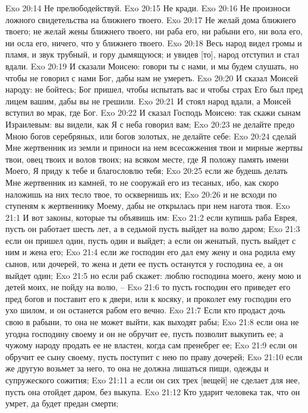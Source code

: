 Exo 20:14  Не прелюбодействуй.
Exo 20:15  Не кради.
Exo 20:16  Не произноси ложного свидетельства на ближнего твоего.
Exo 20:17  Не желай дома ближнего твоего; не желай жены ближнего твоего, ни раба его, ни рабыни его, ни вола его, ни осла его, ничего, что у ближнего твоего.
Exo 20:18  Весь народ видел громы и пламя, и звук трубный, и гору дымящуюся; и увидев [то], народ отступил и стал вдали.
Exo 20:19  И сказали Моисею: говори ты с нами, и мы будем слушать, но чтобы не говорил с нами Бог, дабы нам не умереть.
Exo 20:20  И сказал Моисей народу: не бойтесь; Бог пришел, чтобы испытать вас и чтобы страх Его был пред лицем вашим, дабы вы не грешили.
Exo 20:21  И стоял народ вдали, а Моисей вступил во мрак, где Бог.
Exo 20:22  И сказал Господь Моисею: так скажи сынам Израилевым: вы видели, как Я с неба говорил вам;
Exo 20:23  не делайте предо Мною богов серебряных, или богов золотых, не делайте себе:
Exo 20:24  сделай Мне жертвенник из земли и приноси на нем всесожжения твои и мирные жертвы твои, овец твоих и волов твоих; на всяком месте, где Я положу память имени Моего, Я приду к тебе и благословлю тебя;
Exo 20:25  если же будешь делать Мне жертвенник из камней, то не сооружай его из тесаных, ибо, как скоро наложишь на них тесло твое, то осквернишь их;
Exo 20:26  и не всходи по ступеням к жертвеннику Моему, дабы не открылась при нем нагота твоя.
Exo 21:1  И вот законы, которые ты объявишь им:
Exo 21:2  если купишь раба Еврея, пусть он работает шесть лет, а в седьмой пусть выйдет на волю даром;
Exo 21:3  если он пришел один, пусть один и выйдет; а если он женатый, пусть выйдет с ним и жена его;
Exo 21:4  если же господин его дал ему жену и она родила ему сынов, или дочерей, то жена и дети ее пусть останутся у господина ее, а он выйдет один;
Exo 21:5  но если раб скажет: люблю господина моего, жену мою и детей моих, не пойду на волю, --
Exo 21:6  то пусть господин его приведет его пред богов и поставит его к двери, или к косяку, и проколет ему господин его ухо шилом, и он останется рабом его вечно.
Exo 21:7  Если кто продаст дочь свою в рабыни, то она не может выйти, как выходят рабы;
Exo 21:8  если она не угодна господину своему и он не обручит ее, пусть позволит выкупить ее; а чужому народу продать ее не властен, когда сам пренебрег ее;
Exo 21:9  если он обручит ее сыну своему, пусть поступит с нею по праву дочерей;
Exo 21:10  если же другую возьмет за него, то она не должна лишаться пищи, одежды и супружеского сожития;
Exo 21:11  а если он сих трех [вещей] не сделает для нее, пусть она отойдет даром, без выкупа.
Exo 21:12  Кто ударит человека так, что он умрет, да будет предан смерти;
